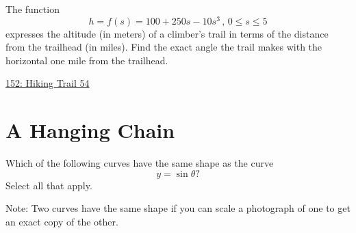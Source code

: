 \documentclass{ximera}
\begin{document}
\begin{question} \label{QOIIdfsdftt444}
The function
\[
 h = f(s) =100+ 250s-10s^3 \, , \, 0\leq s \leq 5
\]
expresses the altitude (in meters) of a climber's trail in terms of the distance from the trailhead (in miles). Find the exact angle the trail makes with the horizontal one mile from the trailhead.

\begin{onlineOnly}
    \begin{center}
\end{center}
\end{onlineOnly}

\href{https://www.desmos.com/calculator/ljcugfqmee}{152: Hiking Trail 54}

\end{question}


\section{A Hanging Chain}

\begin{question} \label{QJFefexxxwe}
Which of the following curves have the same shape as the curve
\[
    y = \sin\theta?
\]
Select all that apply.

\begin{selectAll}
\end{selectAll}

Note: Two curves have the same shape if you can scale a photograph of one to get an exact copy of the other.

\end{question}
\end{document}
